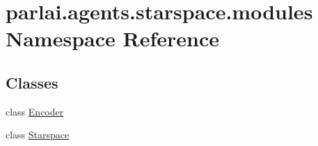 \hypertarget{namespaceparlai_1_1agents_1_1starspace_1_1modules}{}\section{parlai.\+agents.\+starspace.\+modules Namespace Reference}
\label{namespaceparlai_1_1agents_1_1starspace_1_1modules}
\subsection*{Classes}
\begin{DoxyCompactItemize}
\item 
class \hyperlink{classparlai_1_1agents_1_1starspace_1_1modules_1_1Encoder}{Encoder}
\item 
class \hyperlink{classparlai_1_1agents_1_1starspace_1_1modules_1_1Starspace}{Starspace}
\end{DoxyCompactItemize}
